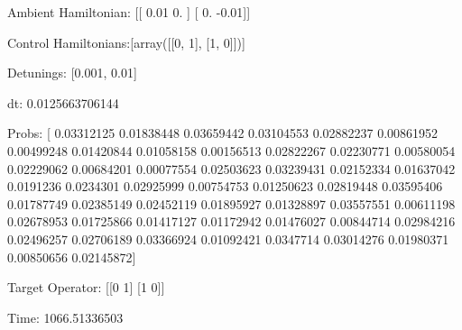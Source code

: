 \documentclass{article}
\begin{document}
    

\newpage

Ambient Hamiltonian: [[ 0.01  0.  ]
 [ 0.   -0.01]]

Control Hamiltonians:[array([[0, 1],
       [1, 0]])]

Detunings: [0.001, 0.01]

 dt: 0.0125663706144

Probs: [ 0.03312125  0.01838448  0.03659442  0.03104553  0.02882237  0.00861952
  0.00499248  0.01420844  0.01058158  0.00156513  0.02822267  0.02230771
  0.00580054  0.02229062  0.00684201  0.00077554  0.02503623  0.03239431
  0.02152334  0.01637042  0.0191236   0.0234301   0.02925999  0.00754753
  0.01250623  0.02819448  0.03595406  0.01787749  0.02385149  0.02452119
  0.01895927  0.01328897  0.03557551  0.00611198  0.02678953  0.01725866
  0.01417127  0.01172942  0.01476027  0.00844714  0.02984216  0.02496257
  0.02706189  0.03366924  0.01092421  0.0347714   0.03014276  0.01980371
  0.00850656  0.02145872]

Target Operator: [[0 1]
 [1 0]]

Time: 1066.51336503
\end{document}
